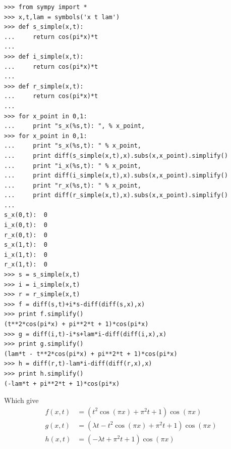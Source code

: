 \documentclass[%
twoside,                 %
final,                   %
10pt]{article}
\begin{document}
\begin{Verbatim}[numbers=none,fontsize=\fontsize{9pt}{9pt},baselinestretch=0.95]
>>> from sympy import *
>>> x,t,lam = symbols('x t lam')
>>> def s_simple(x,t):
...     return cos(pi*x)*t
... 
>>> def i_simple(x,t):
...     return cos(pi*x)*t
... 
>>> def r_simple(x,t):
...     return cos(pi*x)*t
... 
>>> for x_point in 0,1:
...     print "s_x(%s,t): ", % x_point,
>>> for x_point in 0,1:
...     print "s_x(%s,t): " % x_point,
...     print diff(s_simple(x,t),x).subs(x,x_point).simplify()
...     print "i_x(%s,t): " % x_point,
...     print diff(i_simple(x,t),x).subs(x,x_point).simplify()
...     print "r_x(%s,t): " % x_point,
...     print diff(r_simple(x,t),x).subs(x,x_point).simplify()
... 
s_x(0,t):  0
i_x(0,t):  0
r_x(0,t):  0
s_x(1,t):  0
i_x(1,t):  0
r_x(1,t):  0
>>> s = s_simple(x,t)
>>> i = i_simple(x,t)
>>> r = r_simple(x,t)
>>> f = diff(s,t)+i*s-diff(diff(s,x),x)
>>> print f.simplify()
(t**2*cos(pi*x) + pi**2*t + 1)*cos(pi*x)
>>> g = diff(i,t)-i*s+lam*i-diff(diff(i,x),x)
>>> print g.simplify()
(lam*t - t**2*cos(pi*x) + pi**2*t + 1)*cos(pi*x)
>>> h = diff(r,t)-lam*i-diff(diff(r,x),x)
>>> print h.simplify()
(-lam*t + pi**2*t + 1)*cos(pi*x)
\end{Verbatim}
Which give
\begin{equation}
	\begin{aligned}
	f(x,t) &= (t^2\cos(\pi x) + \pi^2t + 1)\cos(\pi x)\\
	g(x,t) &= (\lambda t - t^2\cos(\pi x) + \pi^2t + 1)\cos(\pi x)\\
	h(x,t) &= (-\lambda t + \pi^2t + 1)\cos(\pi x)
	\end{aligned}
\end{equation}
\end{document}
